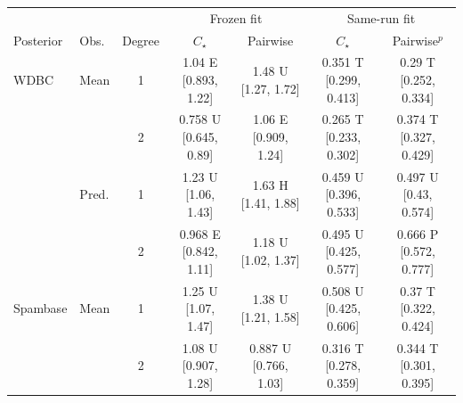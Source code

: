 \begin{tabular}{llccccc}
\toprule
 & & & \multicolumn{2}{c}{Frozen fit} & \multicolumn{2}{c}{Same-run fit} \\
\cmidrule(lr){4-5}\cmidrule(lr){6-7}
Posterior & Obs. & Degree & $C_\star$ & Pairwise & $C_\star$ & Pairwise$^p$ \\
\midrule
WDBC & Mean & 1 & \shortstack{1.04 E \\{} [0.893, 1.22]} & \shortstack{1.48 U \\{} [1.27, 1.72]} & \shortstack{0.351 T \\{} [0.299, 0.413]} & \shortstack{0.29 T \\{} [0.252, 0.334]} \\[2pt]
 &  & 2 & \shortstack{0.758 U \\{} [0.645, 0.89]} & \shortstack{1.06 E \\{} [0.909, 1.24]} & \shortstack{0.265 T \\{} [0.233, 0.302]} & \shortstack{0.374 T \\{} [0.327, 0.429]} \\[2pt]
 & Pred. & 1 & \shortstack{1.23 U \\{} [1.06, 1.43]} & \shortstack{1.63 H \\{} [1.41, 1.88]} & \shortstack{0.459 U \\{} [0.396, 0.533]} & \shortstack{0.497 U \\{} [0.43, 0.574]} \\[2pt]
 &  & 2 & \shortstack{0.968 E \\{} [0.842, 1.11]} & \shortstack{1.18 U \\{} [1.02, 1.37]} & \shortstack{0.495 U \\{} [0.425, 0.577]} & \shortstack{0.666 P \\{} [0.572, 0.777]} \\[2pt]
\addlinespace
Spambase & Mean & 1 & \shortstack{1.25 U \\{} [1.07, 1.47]} & \shortstack{1.38 U \\{} [1.21, 1.58]} & \shortstack{0.508 U \\{} [0.425, 0.606]} & \shortstack{0.37 T \\{} [0.322, 0.424]} \\[2pt]
 &  & 2 & \shortstack{1.08 U \\{} [0.907, 1.28]} & \shortstack{0.887 U \\{} [0.766, 1.03]} & \shortstack{0.316 T \\{} [0.278, 0.359]} & \shortstack{0.344 T \\{} [0.301, 0.395]} \\[2pt]

\end{tabular}
